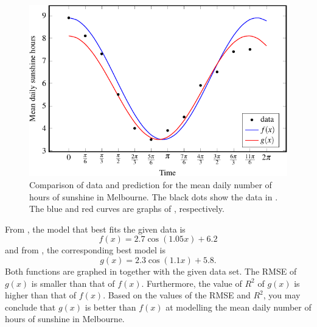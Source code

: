 \documentclass[a4paper,oneside,12pt]{article}
\begin{document}
\begin{problem}
{\begin{solution}
\begin{figure}[!htbp]
\centering
\includegraphics[scale=1.1]{image/13/mean-daily-sunshine-models.pdf}
\caption{%
  Comparison of data and prediction for the mean daily number of hours
  of sunshine in Melbourne.  The black dots show the data in
  .  The blue and red
  curves are graphs of
  ,
  respectively.
}
\label{fig:trigonometric:mean_daily_sunshine_models}
\end{figure}

From ,
the model that best fits the given data is
\begin{equation}
\label{eqn:trigonometric:mean_daily_sunshine_f(x)}
f(x)
=
2.7 \cos(1.05 x) + 6.2
\end{equation}
and
from ,
the corresponding best model is
\begin{equation}
\label{eqn:trigonometric:mean_daily_sunshine_g(x)}
g(x)
=
2.3 \cos(1.1 x) + 5.8.
\end{equation}
Both functions are graphed in
 together with
the given data set.  The RMSE of $g(x)$ is smaller than that of
$f(x)$.  Furthermore, the value of $R^2$ of $g(x)$ is higher than that
of $f(x)$.  Based on the values of the RMSE and $R^2$, you may
conclude that $g(x)$ is better than $f(x)$ at modelling the mean daily
number of hours of sunshine in Melbourne.
\end{solution}
}{}


\end{problem}
\end{document}
